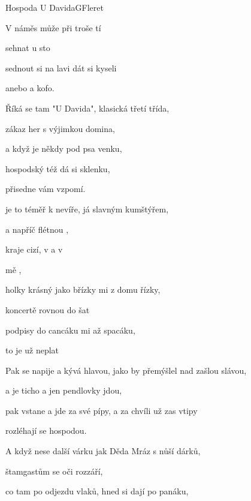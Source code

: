 \setcounter{page}{28}
\begin{song}{Hospoda U Davida}{G}{Fleret}
\begin{SBVerse}
V   náměs může při troše tí

sehnat  u sto

sednout si na lavi dát si  kyseli

anebo  a kofo.
\end{SBVerse}
\begin{SBVerse}
Říká se tam "U Davida", klasická třetí třída,

zákaz her s výjimkou domina,

a když je někdy pod psa venku, 

hospodský též dá si sklenku,

přisedne vám vzpomí.
\end{SBVerse}
\begin{SBChorus}
 je to téměř k nevíře, já  slavným kumštýřem,

 a napříč flétnou ,

 kraje cizí, v  a v 

 mě ,

holky krásný jako břízky  mi z domu řízky,

koncertě rovnou do šat

podpisy do cancáku  mi až  spacáku,

to je  už neplat
\end{SBChorus}

\begin{SBVerse}
Pak se napije a kývá hlavou, jako by přemýšlel nad zašlou slávou,

a je ticho a jen pendlovky jdou,

pak vstane a jde za své pípy, a za chvíli už zas vtipy

rozléhají se hospodou.
\end{SBVerse}
\begin{SBVerse}
A když nese další várku jak Děda Mráz s nůší dárků,

štamgastům se oči rozzáří,

co tam po odjezdu vlaků, hned si dají po panáku,


\end{SBVerse}
\end{song}
